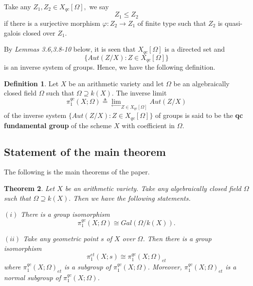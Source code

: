 \documentclass[12pt,twoside,reqno]{amsart}
\newtheorem{theorem}{Theorem}[section]
\theoremstyle{definition}
\newtheorem{definition}[theorem]{Definition}
\numberwithin{equation}{section}
\begin{document}
Take any $Z_{1},Z_{2}\in X_{qc}\left[ \Omega \right] ,$ we say
\begin{equation*}
Z_{1}\leq Z_{2}
\end{equation*}
if there is a surjective morphism $\varphi :Z_{2}\rightarrow Z_{1}$ of
finite type such that $Z_{2}$ is quasi-galois closed over $Z_{1}.$

By \emph{Lemmas 3.6,3.8-10} below, it is seen that $X_{qc}\left[ \Omega \right] $ is a directed set and
\begin{equation*}
\{Aut\left( Z/X\right) :Z\in X_{qc}\left[ \Omega \right] \}
\end{equation*}is an inverse system of groups. Hence, we have the following definition.

\begin{definition}
Let $X$ be an arithmetic variety and let $\Omega $ be an algebraically
closed field $\Omega $ such that $\Omega \supseteq k\left( X\right) .$ The
inverse limit
\begin{equation*}
\pi _{1}^{qc}\left( X;\Omega \right) \triangleq {\lim_{\longleftarrow}}
_{Z\in X_{qc}\left[ \Omega \right] }{Aut\left( Z/X\right)}
\end{equation*}
of the inverse system $\{Aut\left( Z/X\right) :Z\in X_{qc}\left[ \Omega \right] \}$ of groups is said to be the \textbf{qc fundamental group} of the
scheme $X$ with coefficient in $\Omega .$
\end{definition}

\subsection{Statement of the main theorem}

The following is the main theorems of the paper.

\begin{theorem}
Let $X$ be an arithmetic variety. Take any algebraically closed field $\Omega $ such that $\Omega \supseteq k\left( X\right) .$ Then we have the
following statements.

$\left( i\right) $ There is a group isomorphism
\begin{equation*}
\pi _{1}^{qc}\left( X;\Omega \right) \cong Gal\left( {\Omega }/k\left(
X\right) \right) .
\end{equation*}

$\left( ii\right) $ Take any geometric point $s$ of $X$ over $\Omega $. Then
there is a group isomorphism
\begin{equation*}
\pi _{1}^{et}\left( X;s\right) \cong \pi _{1}^{qc}\left( X;\Omega \right)
_{et}
\end{equation*}where $\pi _{1}^{qc}\left( X;\Omega \right) _{et}$ is a subgroup of $\pi
_{1}^{qc}\left( X;\Omega \right) $. Moreover, $\pi _{1}^{qc}\left( X;\Omega
\right) _{et}$ is a normal subgroup of $\pi _{1}^{qc}\left( X;\Omega \right)
$.\bigskip
\end{theorem}
\end{document}
